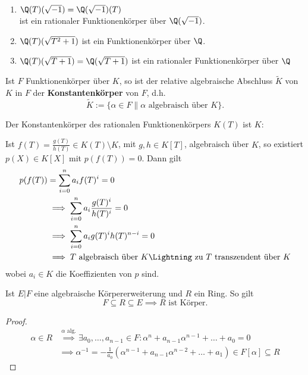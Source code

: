 \begin{beispiel}
    \begin{enumerate}[label=\alph*)]
        \item $\Q(T)(\sqrt{-1}) = \Q(\sqrt{-1})(T)$\\
        ist ein rationaler Funktionenkörper über $\Q(\sqrt{-1})$. 
        
        \item $\Q(T)(\sqrt{T^2+1})$ ist ein Funktionenkörper über $\Q$.

        \item $\Q(T)(\sqrt{T+1}) = \Q(\sqrt{T+1})$ ist ein rationaler Funktionenkörper über $\Q$ 
    \end{enumerate}
\end{beispiel}

\begin{definition}
    Ist $F$ Funktionenkörper über $K$, 
    so ist der relative algebraische Abschluss $\widetilde{K}$ von $K$ in $F$ der 
    \textbf{Konstantenkörper} von $F$, d.h.
    $$ \widetilde{K} := \{\alpha \in F \| \alpha \text{ algebraisch  über } K\}.$$
\end{definition}

\begin{beispiel}\label{beispiel:1.7}
    Der Konstantenkörper des rationalen Funktionenkörpers $K(T)$ ist $K$:

    Ist $f(T) = \frac{g(T)}{h(T)} \in K(T) \setminus K$, mit $g,h \in K[T]$, algebraisch über $K$,
    so existiert $p(X) \in K[X]$ mit $p(f(T)) = 0$. Dann gilt
    \begin{align*}
        p(f(T)) &= \sum\limits_{i=0}^n a_i f(T)^i = 0\\
        & \implies \sum\limits_{i=0}^n a_i \frac{g(T)^i}{h(T)^i} = 0\\
        & \implies \sum\limits_{i=0}^n a_i g(T)^i h(T)^{n-i} = 0 \\
        & \implies T \text{ algebraisch über } K \text{\Lightning zu $T$ transzendent über $K$}
    \end{align*}
    wobei $a_i \in K$ die Koeffizienten von $p$ sind.
\end{beispiel}

\begin{erinnerung}
    Ist $E|F$ eine algebraische Körpererweiterung und $R$ ein Ring. So gilt
    $$ F \subseteq R \subseteq E \implies R \text{ ist Körper.} $$
\end{erinnerung}
\begin{proof}
    \begin{align*}
        \alpha \in R & \stackrel{\alpha \text{ alg.}}{\implies} \exists a_0,\ldots, a_{n-1} \in F: \alpha^n + a_{n-1}\alpha^{n-1}+\ldots+a_0 = 0\\
        & \implies \alpha^{-1} = -\frac{1}{a_0}\left(\alpha^{n-1} + a_{n-1}\alpha^{n-2} + \ldots + a_1\right) \in F[\alpha] \subseteq R
    \end{align*}
\end{proof}

